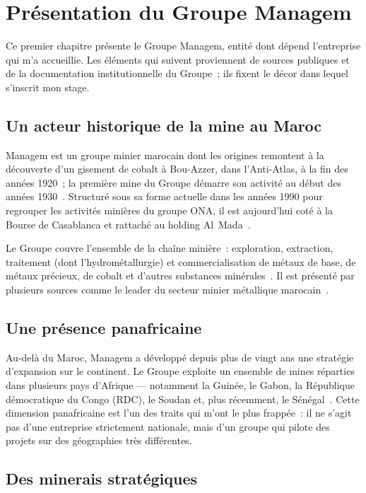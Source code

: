\chapter{Présentation du Groupe Managem}

Ce premier chapitre présente le Groupe Managem, entité dont dépend l'entreprise qui m'a accueillie. Les éléments qui suivent proviennent de sources publiques et de la documentation institutionnelle du Groupe~; ils fixent le décor dans lequel s'inscrit mon stage.

\section{Un acteur historique de la mine au Maroc}

Managem est un groupe minier marocain dont les origines remontent à la découverte d'un gisement de cobalt à Bou-Azzer, dans l'Anti-Atlas, à la fin des années 1920~; la première mine du Groupe démarre son activité au début des années 1930~\cite{managem_wiki}. Structuré sous sa forme actuelle dans les années 1990 pour regrouper les activités minières du groupe ONA, il est aujourd'hui coté à la Bourse de Casablanca et rattaché au holding Al~Mada~\cite{managem_wiki}.

Le Groupe couvre l'ensemble de la chaîne minière~: exploration, extraction, traitement (dont l'hydrométallurgie) et commercialisation de métaux de base, de métaux précieux, de cobalt et d'autres substances minérales~\cite{managem_wiki}. Il est présenté par plusieurs sources comme le leader du secteur minier métallique marocain~\cite{afd_potentiel}.

\section{Une présence panafricaine}

Au-delà du Maroc, Managem a développé depuis plus de vingt ans une stratégie d'expansion sur le continent. Le Groupe exploite un ensemble de mines réparties dans plusieurs pays d'Afrique --- notamment la Guinée, le Gabon, la République démocratique du Congo (RDC), le Soudan et, plus récemment, le Sénégal~\cite{afd_potentiel,ecofin_managem}. Cette dimension panafricaine est l'un des traits qui m'ont le plus frappée~: il ne s'agit pas d'une entreprise strictement nationale, mais d'un groupe qui pilote des projets sur des géographies très différentes.

\section{Des minerais stratégiques}

